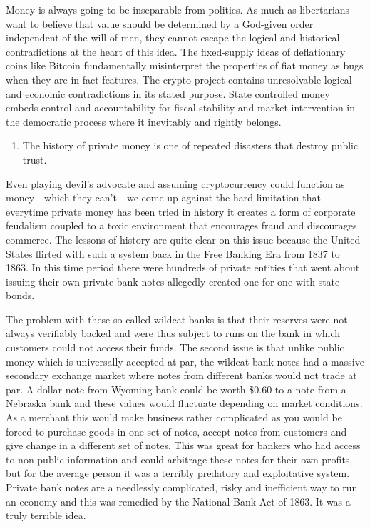 \documentclass[
]{book}
\providecommand{\tightlist}{%
  \setlength{\itemsep}{0pt}\setlength{\parskip}{0pt}}
\begin{document}
Money is always going to be inseparable from politics. As much as libertarians want to believe that value should be determined by a God-given order independent of the will of men, they cannot escape the logical and historical contradictions at the heart of this idea. The fixed-supply ideas of deflationary coins like Bitcoin fundamentally misinterpret the properties of fiat money as bugs when they are in fact features. The crypto project contains unresolvable logical and economic contradictions in its stated purpose. State controlled money embeds control and accountability for fiscal stability and market intervention in the democratic process where it inevitably and rightly belongs.

\begin{enumerate}
\def\labelenumi{\arabic{enumi}.}
\setcounter{enumi}{2}
\tightlist
\item
  The history of private money is one of repeated disasters that destroy public trust.
\end{enumerate}

Even playing devil's advocate and assuming cryptocurrency could function as money---which they can't---we come up against the hard limitation that everytime private money has been tried in history it creates a form of corporate feudalism coupled to a toxic environment that encourages fraud and discourages commerce. The lessons of history are quite clear on this issue because the United States flirted with such a system back in the Free Banking Era from 1837 to 1863. In this time period there were hundreds of private entities that went about issuing their own private bank notes allegedly created one-for-one with state bonds.

The problem with these so-called wildcat banks is that their reserves were not always verifiably backed and were thus subject to runs on the bank in which customers could not access their funds. The second issue is that unlike public money which is universally accepted at par, the wildcat bank notes had a massive secondary exchange market where notes from different banks would not trade at par. A dollar note from Wyoming bank could be worth \$0.60 to a note from a Nebraska bank and these values would fluctuate depending on market conditions. As a merchant this would make business rather complicated as you would be forced to purchase goods in one set of notes, accept notes from customers and give change in a different set of notes. This was great for bankers who had access to non-public information and could arbitrage these notes for their own profits, but for the average person it was a terribly predatory and exploitative system. Private bank notes are a needlessly complicated, risky and inefficient way to run an economy and this was remedied by the National Bank Act of 1863. It was a truly terrible idea.
\end{document}
